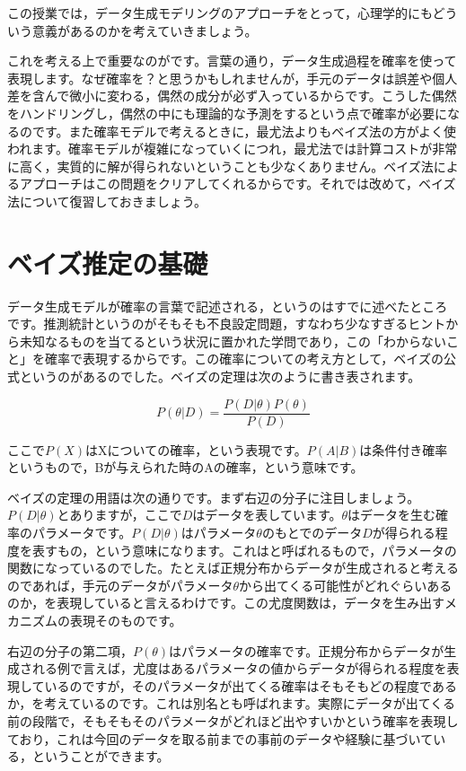 \documentclass{ltjsbook}
\begin{document}
この授業では，データ生成モデリングのアプローチをとって，心理学的にもどういう意義があるのかを考えていきましょう。

これを考える上で重要なのがです。言葉の通り，データ生成過程を確率を使って表現します。なぜ確率を？と思うかもしれませんが，手元のデータは誤差や個人差を含んで微小に変わる，偶然の成分が必ず入っているからです。こうした偶然をハンドリングし，偶然の中にも理論的な予測をするという点で確率が必要になるのです。また確率モデルで考えるときに，最尤法よりもベイズ法の方がよく使われます。確率モデルが複雑になっていくにつれ，最尤法では計算コストが非常に高く，実質的に解が得られないということも少なくありません。ベイズ法によるアプローチはこの問題をクリアしてくれるからです。それでは改めて，ベイズ法について復習しておきましょう。

\section{ベイズ推定の基礎}

データ生成モデルが確率の言葉で記述される，というのはすでに述べたところです。推測統計というのがそもそも不良設定問題，すなわち少なすぎるヒントから未知なるものを当てるという状況に置かれた学問であり，この「わからないこと」を確率で表現するからです。この確率についての考え方として，ベイズの公式というのがあるのでした。ベイズの定理は次のように書き表されます。

$$ P(\theta|D) = \frac{P(D|\theta)P(\theta)}{P(D)} $$

ここで$P(X)$はXについての確率，という表現です。$P(A|B)$は条件付き確率というもので，Bが与えられた時のAの確率，という意味です。

ベイズの定理の用語は次の通りです。まず右辺の分子に注目しましょう。$P(D|\theta)$とありますが，ここで$D$はデータを表しています。$\theta$はデータを生む確率のパラメータです。$P(D|\theta)$はパラメータ$\theta$のもとでのデータ$D$が得られる程度を表すもの，という意味になります。これはと呼ばれるもので，パラメータの関数になっているのでした。たとえば正規分布からデータが生成されると考えるのであれば，手元のデータがパラメータ$\theta$から出てくる可能性がどれぐらいあるのか，を表現していると言えるわけです。この尤度関数は，データを生み出すメカニズムの表現そのものです。

右辺の分子の第二項，$P(\theta)$はパラメータの確率です。正規分布からデータが生成される例で言えば，尤度はあるパラメータの値からデータが得られる程度を表現しているのですが，そのパラメータが出てくる確率はそもそもどの程度であるか，を考えているのです。これは別名とも呼ばれます。実際にデータが出てくる前の段階で，そもそもそのパラメータがどれほど出やすいかという確率を表現しており，これは今回のデータを取る前までの事前のデータや経験に基づいている，ということができます。
\end{document}
